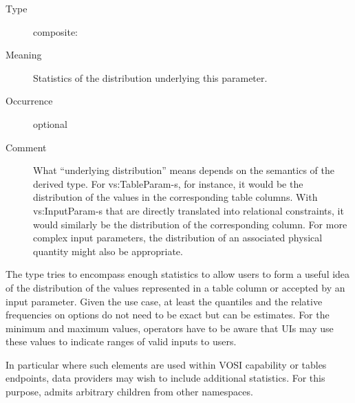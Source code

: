 \documentclass[11pt,a4paper]{ivoa}
\begin{document}
\begin{generated}
\begin{bigdescription}
\begin{description}
\end{description}
\item[Element \xmlel{stats}]
\begin{description}
\item[Type] composite: 
\item[Meaning] Statistics of the distribution underlying this parameter.
\item[Occurrence] optional
\item[Comment] What “underlying distribution” means depends on the
                  semantics of the derived type.  For vs:TableParam-s, for
                  instance, it would be the distribution of the values in
                  the corresponding table columns.  With vs:InputParam-s
                  that are directly translated into relational constraints,
                  it would similarly be the distribution of the corresponding
                  column.  For more complex input parameters, the
                  distribution of an associated physical quantity might also
                  be appropriate.

\end{description}


\end{bigdescription}\endgroup

\endgroup
\end{generated}


The  type tries to encompass enough statistics to allow
users to form a useful idea of the distribution of the values
represented in a table column or accepted by an input parameter.  Given
the use case, at least the quantiles and the relative frequencies on
options do not need to be exact but can be estimates.  For the minimum
and maximum values, operators have to be aware that UIs may use these
values to indicate ranges of valid inputs to users.

In
particular where such elements are used within VOSI capability or tables
endpoints, data providers may wish to include additional statistics.
For this purpose,  admits arbitrary children from other
namespaces.
\end{document}
